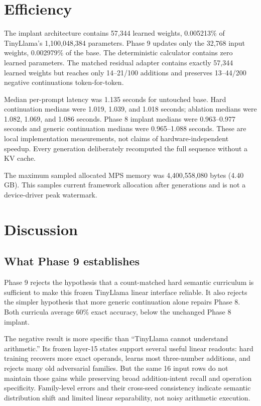 \documentclass[11pt]{article}
\begin{document}
\section{Efficiency}

The implant architecture contains 57,344 learned weights, 0.005213\% of
TinyLlama's 1,100,048,384 parameters. Phase 9 updates only the 32,768 input
weights, 0.002979\% of the base. The deterministic calculator contains zero
learned parameters. The matched residual adapter contains exactly 57,344
learned weights but reaches only 14--21/100 additions and preserves 13--44/200
negative continuations token-for-token.

Median per-prompt latency was 1.135 seconds for untouched base. Hard
continuation medians were 1.019, 1.039, and 1.018 seconds; ablation medians
were 1.082, 1.069, and 1.086 seconds. Phase 8 implant medians were
0.963--0.977 seconds and generic continuation medians were
0.965--1.088 seconds. These are local implementation measurements, not claims
of hardware-independent speedup. Every generation deliberately recomputed the
full sequence without a KV cache.

The maximum sampled allocated MPS memory was 4,400,558,080 bytes (4.40 GB).
This samples current framework allocation after generations and is not a
device-driver peak watermark.

\section{Discussion}

\subsection{What Phase 9 establishes}

Phase 9 rejects the hypothesis that a count-matched hard semantic curriculum
is sufficient to make this frozen TinyLlama linear interface reliable. It also
rejects the simpler hypothesis that more generic continuation alone repairs
Phase 8. Both curricula average 60\% exact accuracy, below the unchanged
Phase 8 implant.

The negative result is more specific than ``TinyLlama cannot understand
arithmetic.'' Its frozen layer-15 states support several useful linear
readouts: hard training recovers more exact operands, learns most
three-number additions, and rejects many old adversarial families. But the
same 16 input rows do not maintain those gains while preserving broad
addition-intent recall and operation specificity. Family-level errors and
their cross-seed consistency indicate semantic distribution shift and limited
linear separability, not noisy arithmetic execution.
\end{document}
